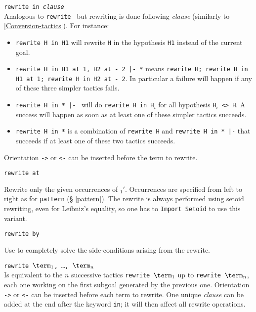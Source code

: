 \begin{coq_example*}
\begin{Variants}
\item {\tt rewrite {\term} in \textit{clause}}
  \\
  Analogous to {\tt rewrite {\term}} but rewriting is done following
  \textit{clause} (similarly to \ref{Conversion-tactics}). For
  instance:
  \begin{itemize}
  \item \texttt{rewrite H in H1} will rewrite \texttt{H} in the hypothesis
    \texttt{H1} instead of the current goal.
  \item \texttt{rewrite H in H1 at 1, H2 at - 2 |- *} means \texttt{rewrite H; rewrite H in H1 at 1;
      rewrite H in H2 at - 2}. In particular a failure will happen if any of
    these three simpler tactics fails.
  \item \texttt{rewrite H in * |- } will do \texttt{rewrite H in
      H$_i$} for all hypothesis \texttt{H$_i$ <> H}. A success will happen
    as soon as at least one of these simpler tactics succeeds.
  \item \texttt{rewrite H in *} is a combination of \texttt{rewrite H}
    and \texttt{rewrite H in * |-} that succeeds if at
    least one of these two tactics succeeds.
  \end{itemize}
  Orientation {\tt ->} or {\tt <-} can be
  inserted before the term to rewrite.

\item {\tt rewrite {\term} at {\occlist}}

  Rewrite only the given occurrences of \term$_1'$. Occurrences are
  specified from left to right as for \texttt{pattern} (\S
  \ref{pattern}). The rewrite is always performed using setoid
  rewriting, even for Leibniz's equality, so one has to
  \texttt{Import Setoid} to use this variant.

\item {\tt rewrite {\term} by {\tac}}

  Use {\tac} to completely solve the side-conditions arising from the
  rewrite.

\item {\tt rewrite $\term_1$, \ldots, $\term_n$}\\
  Is equivalent to the $n$ successive tactics {\tt rewrite $\term_1$}
  up to {\tt rewrite $\term_n$}, each one working on the first subgoal
  generated by the previous one.
  Orientation {\tt ->} or {\tt <-} can be
  inserted before each term to rewrite. One unique \textit{clause}
  can be added at the end after the keyword {\tt in}; it will
  then affect all rewrite operations.


\end{Variants}
\end{coq_example*}
